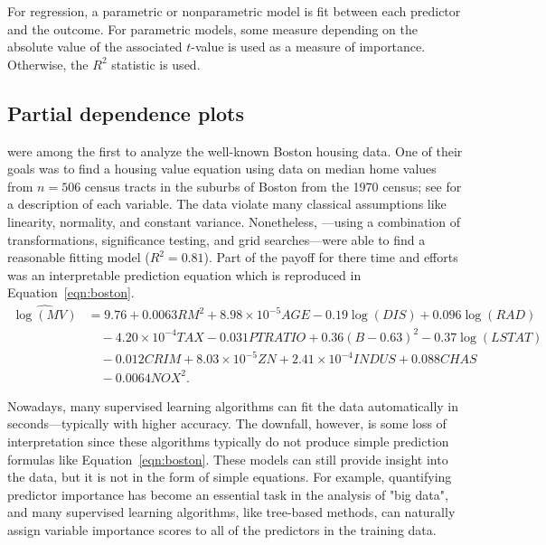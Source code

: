 \documentclass{article}
\begin{document}
For regression, a parametric or nonparametric model is fit between each predictor and the outcome. For parametric models, some measure depending on the absolute value of the associated $t$-value is used as a measure of importance. Otherwise, the $R^2$ statistic is used.


\subsection{Partial dependence plots}

\citet{harrison-1978-hedonic} were among the first to analyze the well-known Boston housing data. One of their goals was to find a housing value equation using data on median home values from $n = 506$ census tracts in the suburbs of Boston from the 1970 census; see \citet[Table IV]{harrison-1978-hedonic} for a description of each variable. The data violate many classical assumptions like linearity, normality, and constant variance. Nonetheless, \citeauthor{harrison-1978-hedonic}---using a combination of transformations, significance testing, and grid searches---were able to find a reasonable fitting model ($R^2 = 0.81$). Part of the payoff for there time and efforts was an interpretable prediction equation which is reproduced in Equation~\eqref{eqn:boston}.
\begin{equation}
\label{eqn:boston}
\begin{aligned}
\widehat{\log\left(MV\right)} &= 9.76 + 0.0063 RM^2 + 8.98\times10^{-5} AGE - 0.19\log\left(DIS\right) + 0.096\log\left(RAD\right) \\
  & \quad - 4.20\times10^{-4} TAX - 0.031 PTRATIO + 0.36\left(B - 0.63\right)^2 - 0.37\log\left(LSTAT\right) \\
  & \quad - 0.012 CRIM + 8.03\times10^{-5} ZN + 2.41\times10^{-4} INDUS + 0.088 CHAS \\
  & \quad - 0.0064 NOX^2.
\end{aligned}
\end{equation}

Nowadays, many supervised learning algorithms can fit the data automatically in seconds---typically with higher accuracy. The downfall, however, is some loss of interpretation since these algorithms typically do not produce simple prediction formulas like Equation~\eqref{eqn:boston}. These models can still provide insight into the data, but it is not in the form of simple equations. For example, quantifying predictor importance has become an essential task in the analysis of "big data", and many supervised learning algorithms, like tree-based methods, can naturally assign variable importance scores to all of the predictors in the training data.
\end{document}
